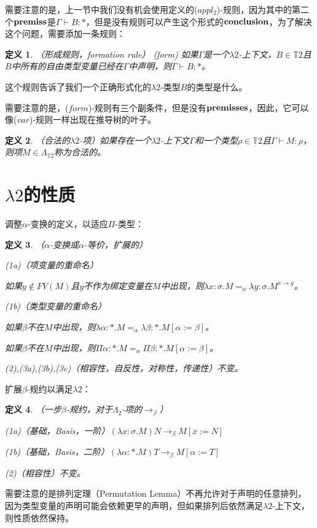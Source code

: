 \documentclass[UTF8]{article}
\newtheorem{thm}{定义}[section]
\begin{document}
		需要注意的是，上一节中我们没有机会使用定义的($appl_2$)-规则，因为其中的第二个$\bf premiss$是$\Gamma\vdash B:*$，但是没有规则可以产生这个形式的$\bf conclusion$，为了解决这个问题，需要添加一条规则：
		
		\begin{thm}（形成规则，formation rule）
			(form) 如果$\Gamma$是一个$\lambda{2}$-上下文，$B\in\mathbb{T}2$且$B$中所有的自由类型变量已经在$\Gamma$中声明，则$\Gamma\vdash B:*$。
		\end{thm}
		
		这个规则告诉了我们一个正确形式化的$\lambda{2}$-类型$B$的类型是什么。
		
		需要注意的是，($form$)-规则有三个副条件，但是没有$\bf premisses$，因此，它可以像($var$)-规则一样出现在推导树的叶子。
		
		\begin{thm}（合法的$\lambda{2}$-项）如果存在一个$\lambda{2}$-上下文$\Gamma$和一个类型$\rho\in\mathbb{T}2$且$\Gamma\vdash M:\rho$，则项$M\in\Lambda_{\mathbb{T}2}$称为合法的。
		\end{thm}
	
	\section{$\lambda{2}$的性质}
		调整$\alpha$-变换的定义，以适应$\Pi$-类型：
		
		\begin{thm}（$\alpha$-变换或$\alpha$-等价，扩展的）
			
			(1a)（项变量的重命名）
			
			如果$y\notin FV(M)$且$y$不作为绑定变量在$M$中出现，则$\lambda x:\sigma.M=_\alpha\lambda y:\sigma.M^{x\rightarrow y}$。
			
			(1b)（类型变量的重命名）
			
			如果$\beta$不在$M$中出现，则$\lambda\alpha:*.M=_\alpha\lambda\beta:*.M\left[\alpha:=\beta\right]$。
			
			如果$\beta$不在$M$中出现，则$\Pi\alpha:*.M=_\alpha\Pi\beta:*.M\left[\alpha:=\beta\right]$。
			
			(2),(3a),(3b),(3c)（相容性，自反性，对称性，传递性）不变。
			
		\end{thm}
	
		扩展$\beta$-规约以满足$\lambda{2}$：
		
		\begin{thm}（一步$\beta$-规约，对于$\Lambda_2$-项的$\rightarrow_\beta$）
			
			(1a)（基础，Basis，一阶）$(\lambda x:\sigma.M)N \rightarrow_\beta M\left[x:=N\right]$
			
			(1b)（基础，Basis，二阶）$(\lambda\alpha:*.M)T\rightarrow_\beta M\left[\alpha:= T\right]$
			
			(2)（相容性）不变。
		\end{thm}
		
		需要注意的是排列定理（Permutation Lemma）不再允许对于声明的任意排列，因为类型变量的声明可能会依赖更早的声明，但如果排列后依然满足$\lambda{2}$-上下文，则性质依然保持。
		
\end{document}
